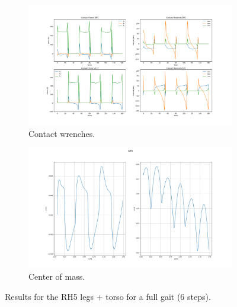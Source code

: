 \begin{figure}[h!]
\medskip
\begin{subfigure}{.5\textwidth}
  	\centering
	\includegraphics[width=1\linewidth]{Media/Crocoddyl/RH5Torso/FixTorsoFalling/RH5TorsoGait_FixFalling_ContactWrenches.png}
	\caption{Contact wrenches.}
\end{subfigure}
\hfill
\begin{subfigure}{.5\textwidth}
  	\centering
	\includegraphics[width=1\linewidth]{Media/Crocoddyl/RH5Torso/FixTorsoFalling/RH5TorsoGait_FixFalling_CoM2.png}
	\caption{Center of mass.}
\end{subfigure}
\caption{Results for the RH5 legs + torso for a full gait (6 steps).}
\label{fig:rh5Torso_full_gait}
\centering
\end{figure}








 